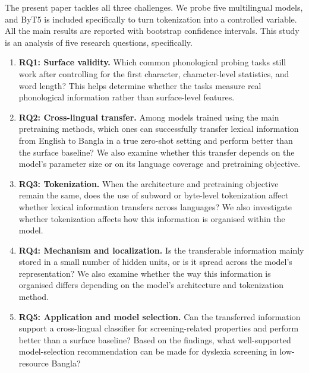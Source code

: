 \documentclass[preprint,12pt]{elsarticle}
\begin{document}
The present paper tackles all three challenges. We probe five multilingual models, and ByT5 is included specifically to turn tokenization into a controlled variable. All the main results are reported with bootstrap confidence intervals. This study is an analysis of five research questions, specifically.
\begin{enumerate}
\item \textbf{RQ1: Surface validity.} Which common phonological probing tasks still work after controlling for the first character, character-level statistics, and word length? This helps determine whether the tasks measure real phonological information rather than surface-level features.
\item \textbf{RQ2: Cross-lingual transfer.} Among models trained using the main pretraining methods, which ones can successfully transfer lexical information from English to Bangla in a true zero-shot setting and perform better than the surface baseline? We also examine whether this transfer depends on the model's parameter size or on its language coverage and pretraining objective.
\item \textbf{RQ3: Tokenization.} When the architecture and pretraining objective remain the same, does the use of subword or byte-level tokenization affect whether lexical information transfers across languages? We also investigate whether tokenization affects how this information is organised within the model.
\item \textbf{RQ4: Mechanism and localization.} Is the transferable information mainly stored in a small number of hidden units, or is it spread across the model's representation? We also examine whether the way this information is organised differs depending on the model's architecture and tokenization method.
\item \textbf{RQ5: Application and model selection.} Can the transferred information support a cross-lingual classifier for screening-related properties and perform better than a surface baseline? Based on the findings, what well-supported model-selection recommendation can be made for dyslexia screening in low-resource Bangla?
\end{enumerate}
\end{document}
